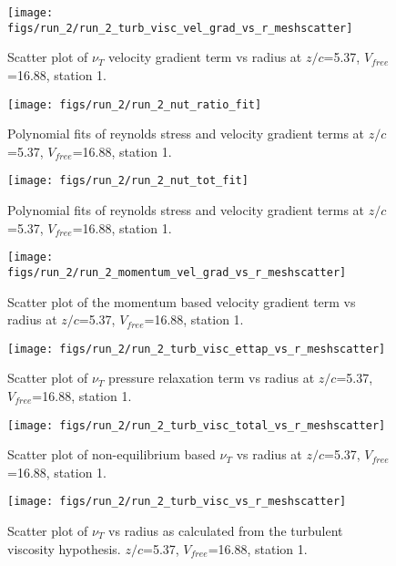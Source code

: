 \begin{figure}[H]
\centering
\texttt{[image: figs/run\_2/run\_2\_turb\_visc\_vel\_grad\_vs\_r\_meshscatter]}
\caption{Scatter plot of $\nu_T$ velocity gradient term vs radius at $z/c$=5.37, $V_{free}$=16.88, station 1.}
\end{figure}


\begin{figure}[H]
\centering
\texttt{[image: figs/run\_2/run\_2\_nut\_ratio\_fit]}
\caption{Polynomial fits of reynolds stress and velocity gradient terms at $z/c$=5.37, $V_{free}$=16.88, station 1.}
\end{figure}


\begin{figure}[H]
\centering
\texttt{[image: figs/run\_2/run\_2\_nut\_tot\_fit]}
\caption{Polynomial fits of reynolds stress and velocity gradient terms at $z/c$=5.37, $V_{free}$=16.88, station 1.}
\end{figure}


\begin{figure}[H]
\centering
\texttt{[image: figs/run\_2/run\_2\_momentum\_vel\_grad\_vs\_r\_meshscatter]}
\caption{Scatter plot of the momentum based velocity gradient term vs radius at $z/c$=5.37, $V_{free}$=16.88, station 1.}
\end{figure}


\begin{figure}[H]
\centering
\texttt{[image: figs/run\_2/run\_2\_turb\_visc\_ettap\_vs\_r\_meshscatter]}
\caption{Scatter plot of $\nu_T$ pressure relaxation term vs radius at $z/c$=5.37, $V_{free}$=16.88, station 1.}
\end{figure}


\begin{figure}[H]
\centering
\texttt{[image: figs/run\_2/run\_2\_turb\_visc\_total\_vs\_r\_meshscatter]}
\caption{Scatter plot of non-equilibrium based $\nu_T$ vs radius at $z/c$=5.37, $V_{free}$=16.88, station 1.}
\end{figure}


\begin{figure}[H]
\centering
\texttt{[image: figs/run\_2/run\_2\_turb\_visc\_vs\_r\_meshscatter]}
\caption{Scatter plot of $\nu_T$ vs radius as calculated from the turbulent viscosity hypothesis. $z/c$=5.37, $V_{free}$=16.88, station 1.}
\end{figure}


